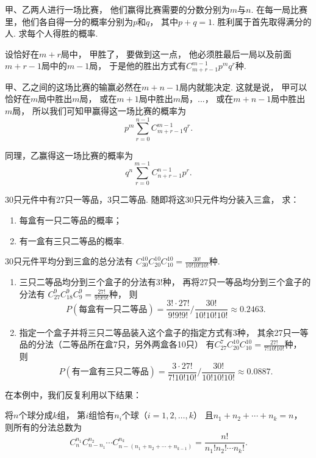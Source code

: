 \begin{example}[得分问题]
甲、乙两人进行一场比赛，
他们赢得比赛需要的分数分别为\(m\)与\(n\).
在每一局比赛里，他们各自得一分的概率分别为\(p\)和\(q\)，
其中\(p+q=1\).
胜利属于首先取得满分的人.
求每个人得胜的概率.
\begin{solution}
设恰好在\(m+r\)局中，
甲胜了，
要做到这一点，
他必须胜最后一局以及前面\(m+r-1\)局中的\(m-1\)局，
于是他的胜出方式有\(C_{m+r-1}^{m-1} p^m q^r\)种.

甲、乙之间的这场比赛的输赢必然在\(m+n-1\)局内就能决定.
这就是说，
甲可以恰好在\(m\)局中胜出\(m\)局，
或在\(m+1\)局中胜出\(m\)局，...，
或在\(m+n-1\)局中胜出\(m\)局，
所以我们可知甲赢得这一场比赛的概率为\[
	p^m \sum_{r=0}^{n-1} C_{m+r-1}^{m-1} q^r.
\]

同理，乙赢得这一场比赛的概率为\[
	q^n \sum_{r=0}^{m-1} C_{n+r-1}^{n-1} p^r.
\]
\end{solution}
\end{example}

\begin{example}
30只元件中有27只一等品，3只二等品.
随即将这30只元件均分装入三盒，
求：\begin{enumerate}
	\item 每盒有一只二等品的概率；
	\item 有一盒有三只二等品的概率.
\end{enumerate}
\begin{solution}
30只元件平均分到三盒的总分法有
\(C_{30}^{10} C_{20}^{10} C_{10}^{10} = \frac{30!}{10! 10! 10!}\)种.
\begin{enumerate}
	\item 三只二等品均分到三个盒子的分法有\(3!\)种，
	再将27只一等品均分到三个盒子的分法有
	\(C_{27}^9 C_{18}^9 C_9^9 = \frac{27!}{9! 9! 9!}\)种，
	则\[
		P(\text{每盒有一只二等品})
		=\frac{3! \cdot 27!}{9! 9! 9!} \bigg/ \frac{30!}{10! 10! 10!} \approx 0.2463.
	\]

	\item 指定一个盒子并将三只二等品装入这个盒子的指定方式有\(3\)种，
	其余27只一等品的分法（二等品所在盒7只，另外两盒各10只）
	有\(C_{27}^7 C_{20}^{10} C_{10}^{10} = \frac{27!}{7! 10! 10!}\)种，
	则\[
		P(\text{有一盒有三只二等品})
		= \frac{3 \cdot 27!}{7! 10! 10!} \bigg/ \frac{30!}{10! 10! 10!} \approx 0.0887.
	\]
\end{enumerate}
\end{solution}
在本例中，我们反复利用以下结果：

将\(n\)个球分成\(k\)组，
第\(i\)组恰有\(n_i\)个球（\(i=1,2,\dotsc,k\)）
且\(n_1+n_2+\dotsb+n_k=n\)，
则所有的分法总数为\begin{equation}
	C_n^{n_1} C_{n-n_1}^{n_2} \dotsm C_{n-(n_1+n_2+\dotsb+n_{k-1})}^{n_k}
	= \frac{n!}{n_1! n_2! \dotsm n_k!}.
\end{equation}
\end{example}

